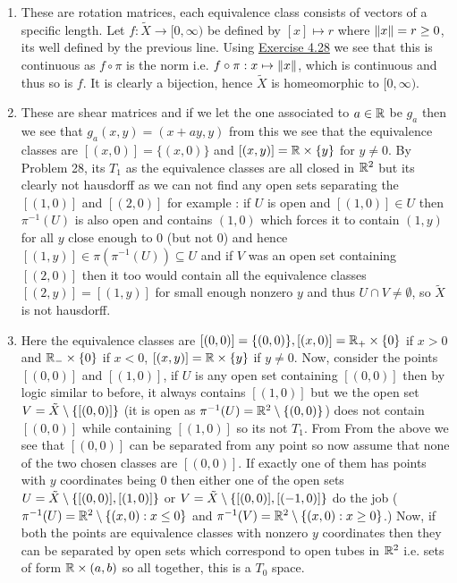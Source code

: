 \documentclass[12pt,a4paper]{article}
\begin{document}
\begin{solution}
\begin{enumerate}[label=\alph*.]
\item These are rotation matrices, each equivalence class consists of vectors of a specific length. 
    Let $f:\tilde{X}\to [0,\infty)$ be defined by $[x]\mapsto r$ where $\norm{x}=r\geq 0$, its well defined by the previous line.  
    Using \hyperref[prob:4-28]{Exercise 4.28} we see that this is continuous as $f\circ\pi$ is the norm i.e. $f\circ\pi:x\mapsto\norm{x}$, which is continuous and thus so is $f.$ 
    It is clearly a bijection, hence $\tilde X$ is homeomorphic to $[0,\infty).$ 
\item These are shear matrices and if we let the one associated to $a\in\mathbb{R}$ be $g_a$ then we see that $g_a(x,y)=(x+ay,y)$ from this we see that the equivalence classes are $[(x,0)]=\{(x,0)\}$ and $[(x,y)]=\mathbb{R}\times\{y\}$ for $y\neq 0$. 
    By Problem 28, its $T_1$ as the equivalence classes are all closed in $\mathbb{R}^2$ but its clearly not hausdorff as we can not find any open sets separating the $[(1,0)]$ and $[(2,0)]$ for example : if $U$ is open and $[(1,0)]\in U$ then $\pi^{-1}(U)$ is also open and contains $(1,0)$ which forces it to contain $(1,y)$ for all $y$ close enough to $0$ (but not $0$) and hence $[(1,y)]\in\pi(\pi^{-1}(U))\subseteq U$ and if $V$ was an open set containing $[(2,0)]$ then it too would contain all the equivalence classes $[(2,y)]=[(1,y)]$ for small enough nonzero $y$ and thus $U\cap V\neq\emptyset$, so $\tilde{X}$ is not hausdorff. 
\item Here the equivalence classes are $[(0,0)]=\{(0,0)\},[(x,0)]=\mathbb{R}_+\times\{0\}$ if $x>0$ and $\mathbb{R}_-\times\{0\}$ if $x<0$, $[(x,y)]=\mathbb{R}\times\{y\}$ if $y\neq 0$. 
    Now, consider the points $[(0,0)]$ and $[(1,0)]$, if $U$ is any open set containing $[(0,0)]$ then by logic similar to before, it always contains $[(1,0)]$ but we the open set $V=\tilde{X}\setminus \qty{[(0,0)]}$ (it is open as $\pi^{-1}(U)=\mathbb{R}^2\setminus\{(0,0)\}$) does not contain $[(0,0)]$ while containing $[(1,0)]$ so its not $T_1$. 
    From From the above we see that $[(0,0)]$ can be separated from any point so now assume that none of the two chosen classes are $[(0,0)].$ 
    If exactly one of them has points with $y$ coordinates being $0$ then either one of the open sets $U=\tilde{X}\setminus \qty{[(0,0)],[(1,0)]}$ or $V=\tilde{X}\setminus \qty{[(0,0)],[(-1,0)]}$ do the job ($\pi^{-1}(U)=\mathbb{R}^2\setminus \qty{(x,0):x\leq 0}$ and $\pi^{-1}(V)=\mathbb{R}^2\setminus \qty{(x,0):x\geq 0}$.) 
    Now, if both the points are equivalence classes with nonzero $y$ coordinates then they can be separated by open sets which correspond to open tubes in $\mathbb{R}^2$ i.e. sets of form $\mathbb{R}\times(a,b)$ so all together, this is a $T_0$ space. 

\end{enumerate}
\end{solution}
\end{document}
